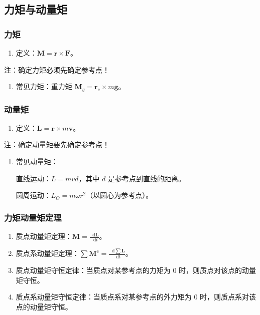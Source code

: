 \documentclass[UTF8,fontset=fandol,zihao=5]{ctexart}
\newcommand{\vect}[1]{\bm{#1}}
\newcommand{\dif}{\mathop{}\!\mathrm{d}}
\begin{document}
\subsection{力矩与动量矩}

\subsubsection{力矩}

\begin{enumerate}
  \item 定义：\(\vect M=\vect r\times\vect F\)。
\end{enumerate}

注：确定力矩必须先确定参考点！

\begin{enumerate}[resume]
  \item 常见力矩：重力矩 \(\vect M_g=\vect r_c\times m\vect g\)。
\end{enumerate}

\subsubsection{动量矩}

\begin{enumerate}
  \item 定义：\(\vect L=\vect r\times m\vect v\)。
\end{enumerate}

注：确定动量矩要先确定参考点！

\begin{enumerate}[resume]
  \item 常见动量矩：

  直线运动：\(L=mvd\)，其中 \(d\) 是参考点到直线的距离。

  圆周运动：\(L_O=m\omega r^2\)（以圆心为参考点）。
\end{enumerate}

\subsubsection{力矩动量矩定理}

\begin{enumerate}
  \item 质点动量矩定理：\(\displaystyle\vect M=\frac{\dif\vect L}{\dif t}\)。
  \item 质点系动量矩定理：\(\displaystyle\sum\vect M^{\mathrm e}=\frac{\dif\sum\vect L}{\dif t}\)。
  \item 质点动量矩守恒定律：当质点对某参考点的力矩为 0 时，则质点对该点的动量矩守恒。
  \item 质点系动量矩守恒定律：当质点系对某参考点的外力矩为 0 时，则质点系对该点的动量矩守恒。
\end{enumerate}
\end{document}
